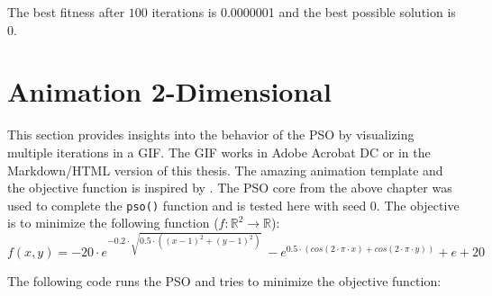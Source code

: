 \documentclass[
  oneside]{book}
\begin{document}
The best fitness after \(100\) iterations is 0.0000001 and the best possible solution is \(0\).

\hypertarget{animation-2-dimensional}{%
\section{Animation 2-Dimensional}\label{animation-2-dimensional}}

This section provides insights into the behavior of the PSO by visualizing multiple iterations in a GIF. The GIF works in Adobe Acrobat DC or in the Markdown/HTML version of this thesis. The amazing animation template and the objective function is inspired by \citep{Rtic2021}. The PSO core from the above chapter was used to complete the \texttt{pso()} function and is tested here with seed 0. The objective is to minimize the following function (\(f:\mathbb{R}^2 \rightarrow \mathbb{R}\)):
\[
f(x, y) = -20\cdot e^{-0.2 \cdot \sqrt{0.5 \cdot ((x-1)^2 + (y-1)^2)}} \ - e^{0.5 \cdot ( cos(2\cdot \pi \cdot x) + cos(2\cdot \pi \cdot y))} + e + 20
\]

The following code runs the PSO and tries to minimize the objective function:
\end{document}
